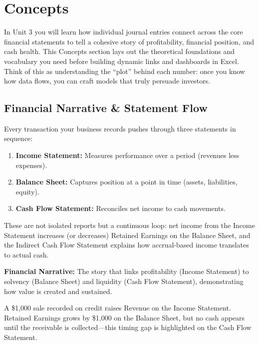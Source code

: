 
\section{Concepts}
\label{sec:unit3_concepts}

In Unit 3 you will learn how individual journal entries connect across the core financial statements to tell a cohesive story of profitability, financial position, and cash health. This Concepts section lays out the theoretical foundations and vocabulary you need before building dynamic links and dashboards in Excel. Think of this as understanding the “plot” behind each number: once you know how data flows, you can craft models that truly persuade investors.

\subsection{Financial Narrative \& Statement Flow}
Every transaction your business records pushes through three statements in sequence:

\begin{enumerate}
  \item \textbf{Income Statement:} Measures performance over a period (revenues less expenses).
  \item \textbf{Balance Sheet:} Captures position at a point in time (assets, liabilities, equity).
  \item \textbf{Cash Flow Statement:} Reconciles net income to cash movements.
\end{enumerate}

These are not isolated reports but a continuous loop: net income from the Income Statement increases (or decreases) Retained Earnings on the Balance Sheet, and the Indirect Cash Flow Statement explains how accrual-based income translates to actual cash.

\begin{Definition}
\textbf{Financial Narrative:} The story that links profitability (Income Statement) to solvency (Balance Sheet) and liquidity (Cash Flow Statement), demonstrating how value is created and sustained.
\end{Definition}

\begin{Example}
A \$1,000 sale recorded on credit raises Revenue on the Income Statement. Retained Earnings grows by \$1,000 on the Balance Sheet, but no cash appears until the receivable is collected—this timing gap is highlighted on the Cash Flow Statement.
\end{Example}

